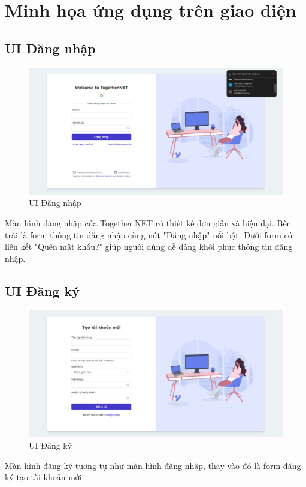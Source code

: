 \documentclass[../index.tex]{subfiles}
\begin{document}
    \section{Minh họa ứng dụng trên giao diện}

    \subsection{UI Đăng nhập}
    \begin{figure}[H]
        \centering
        \includegraphics[width=1\linewidth]{figures/demo/sign-in-page}
        \caption{UI Đăng nhập}
    \end{figure}
    Màn hình đăng nhập của Together.NET có thiết kế đơn giản và hiện đại. Bên trái
    là form thông tin đăng nhập cùng nút "Đăng nhập" nổi bật. Dưới form có liên
    kết "Quên mật khẩu?" giúp người dùng dễ dàng khôi phục thông tin đăng nhập.

    \subsection{UI Đăng ký}
    \begin{figure}[H]
        \centering
        \includegraphics[width=1\linewidth]{figures/demo/sign-up-page}
        \caption{UI Đăng ký}
    \end{figure}
    Màn hình đăng ký tương tự như màn hình đăng nhập, thay vào đó là form đăng
    ký tạo tài khoản mới.
\end{document}
